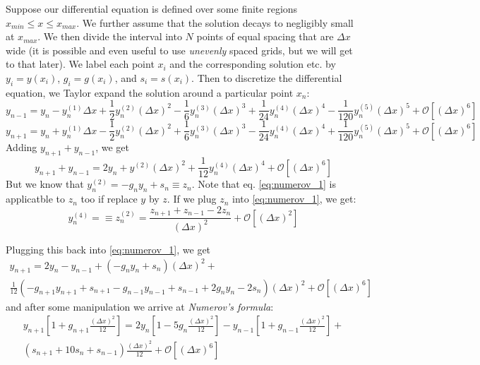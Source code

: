 \documentclass[prb,aps,11pt,superscriptaddress,floatfix]{revtex4-2}
\begin{document}
Suppose our differential equation is defined over some finite regions $x_{min}\leq x \leq x_{max}$. We further assume that the solution decays to negligibly small at $x_{max}$. We then divide the interval into $N$ points of equal spacing that are $\Delta x$ wide (it is possible and even useful to use \emph{unevenly} spaced grids, but we will get to that later). We label each point $x_i$ and the corresponding solution etc. by $y_i=y(x_i)$, $g_i=g(x_i)$, and $s_i=s(x_i)$. Then to discretize the differential equation, we Taylor expand the solution around a particular point $x_n$:
\begin{equation}
    y_{n-1}=y_n-y^{(1)}_n\Delta x + \frac{1}{2} y^{(2)}_n(\Delta x)^2 - \frac{1}{6} y^{(3)}_n(\Delta x)^3 + \frac{1}{24} y^{(4)}_n(\Delta x)^4 - \frac{1}{120} y^{(5)}_n(\Delta x)^5+\mathcal{O}\left[ (\Delta x)^6 \right]
\end{equation}
\begin{equation}
    y_{n+1}=y_n+y^{(1)}_n\Delta x - \frac{1}{2} y^{(2)}_n(\Delta x)^2 + \frac{1}{6} y^{(3)}_n(\Delta x)^3 - \frac{1}{24} y^{(4)}_n(\Delta x)^4 + \frac{1}{120} y^{(5)}_n(\Delta x)^5+\mathcal{O}\left[ (\Delta x)^6 \right]
\end{equation}
Adding $y_{n+1}+y_{n-1}$, we get 
\begin{equation}
    y_{n+1}+y_{n-1}=2y_n+y^{(2)}(\Delta x)^2 + \frac{1}{12} y^{(4)}_n(\Delta x)^4 + \mathcal{O}\left[ (\Delta x)^6 \right]
    \label{eq:numerov_1}
\end{equation}
But we know that $y^{(2)}_n=-g_ny_n+s_n\equiv z_n$. Note that eq. \ref{eq:numerov_1} is applicatble to $z_n$ too if replace $y$ by $z$. If we plug $z_n$ into \ref{eq:numerov_1}, we get:
\begin{equation}
    y^{(4)}_n=\equiv z^{(2)}_n = \frac{z_{n+1}+z_{n-1}-2z_n}{(\Delta x)^2}+\mathcal{O}\left[ (\Delta x)^2 \right]
\end{equation}


Plugging this back into \ref{eq:numerov_1}, we get 
\begin{multline}
    y_{n+1}=2y_n - y_{n-1} + (-g_n y_n+s_n)(\Delta x)^2 + \\ \frac{1}{12} (-g_{n+1}y_{n+1} + s_{n+1} - g_{n-1}y_{n-1}+s_{n-1}+2g_n y_n -2s_n)(\Delta x)^2 + \mathcal{O}[(\Delta x)^6]
\end{multline}
and after some manipulation we arrive at \emph{Numerov's formula}:
\begin{multline}
    y_{n+1}\left[1+g_{n+1}\frac{(\Delta x)^2}{12} \right]= 2y_n \left[ 1 - 5 g_n \frac{(\Delta x)^2}{12} \right] - y_{n-1} \left[1+g_{n-1}\frac{(\Delta x)^2}{12} \right] + \\ (s_{n+1}+10 s_n +s_{n-1})\frac{(\Delta x)^2}{12}+\mathcal{O}[(\Delta x)^6]
    \label{eq:numerov}
\end{multline}
\end{document}
